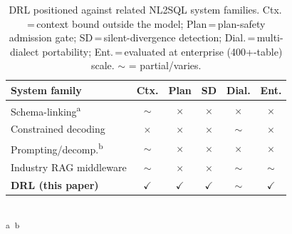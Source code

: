 \documentclass[twocolumn]{svjour3}
\begin{document}
\begin{table}[t]
\centering
\caption{DRL positioned against related NL2SQL system families. Ctx.\,=\,context bound outside the model; Plan\,=\,plan-safety admission gate; SD\,=\,silent-divergence detection; Dial.\,=\,multi-dialect portability; Ent.\,=\,evaluated at enterprise (400+-table) scale. $\sim$ = partial/varies.}
\label{tab:comparison}
\footnotesize
\begin{tabular}{@{}lccccc@{}}
\toprule
\textbf{System family} & \textbf{Ctx.} & \textbf{Plan} & \textbf{SD} & \textbf{Dial.} & \textbf{Ent.} \\
\midrule
Schema-linking\textsuperscript{a} & $\sim$ & $\times$ & $\times$ & $\times$ & $\times$ \\
Constrained decoding~\cite{scholak2021picard} & $\times$ & $\times$ & $\times$ & $\sim$ & $\times$ \\
Prompting/decomp.\textsuperscript{b} & $\sim$ & $\times$ & $\times$ & $\times$ & $\times$ \\
Industry RAG middleware & $\sim$ & $\times$ & $\times$ & $\sim$ & $\sim$ \\
\textbf{DRL (this paper)} & \textbf{$\checkmark$} & \textbf{$\checkmark$} & \textbf{$\checkmark$} & $\sim$ & \textbf{$\checkmark$} \\
\bottomrule
\end{tabular}\\
{\scriptsize \textsuperscript{a}~\cite{guo2019irnet,wang2020ratsql,cao2021lgesql,li2023resdsql}\quad \textsuperscript{b}~\cite{pourreza2023dinsql,gao2023dail,liu2023divide}}
\end{table}
\end{document}
